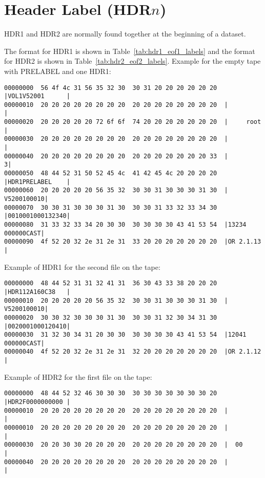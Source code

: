 \section{Header Label (HDR$n$)}

HDR1 and HDR2 are normally found together at the beginning of a dataset.

The format for HDR1 is shown in Table~\ref{tab:hdr1_eof1_labels} and the format for HDR2 is shown in
Table~\ref{tab:hdr2_eof2_labels}.
Example for the empty tape with PRELABEL and one HDR1:
\begin{small}
\begin{verbatim}
00000000  56 4f 4c 31 56 35 32 30  30 31 20 20 20 20 20 20  |VOL1V52001      |
00000010  20 20 20 20 20 20 20 20  20 20 20 20 20 20 20 20  |                |
00000020  20 20 20 20 20 72 6f 6f  74 20 20 20 20 20 20 20  |     root       |
00000030  20 20 20 20 20 20 20 20  20 20 20 20 20 20 20 20  |                |
00000040  20 20 20 20 20 20 20 20  20 20 20 20 20 20 20 33  |               3|
00000050  48 44 52 31 50 52 45 4c  41 42 45 4c 20 20 20 20  |HDR1PRELABEL    |
00000060  20 20 20 20 20 56 35 32  30 30 31 30 30 30 31 30  |     V5200100010|
00000070  30 30 31 30 30 30 31 30  30 30 31 33 32 33 34 30  |0010001000132340|
00000080  31 33 32 33 34 20 30 30  30 30 30 30 43 41 53 54  |13234 000000CAST|
00000090  4f 52 20 32 2e 31 2e 31  33 20 20 20 20 20 20 20  |OR 2.1.13       |
\end{verbatim}
\end{small}
Example of HDR1 for the second file on the tape:
\begin{small}
\begin{verbatim}
00000000  48 44 52 31 31 32 41 31  36 30 43 33 38 20 20 20  |HDR112A160C38   |
00000010  20 20 20 20 20 56 35 32  30 30 31 30 30 30 31 30  |     V5200100010|
00000020  30 30 32 30 30 30 31 30  30 30 31 32 30 34 31 30  |0020001000120410|
00000030  31 32 30 34 31 20 30 30  30 30 30 30 43 41 53 54  |12041 000000CAST|
00000040  4f 52 20 32 2e 31 2e 31  32 20 20 20 20 20 20 20  |OR 2.1.12       |
\end{verbatim}
\end{small}
Example of HDR2 for the first file on the tape:
\begin{small}
\begin{verbatim}
00000000  48 44 52 32 46 30 30 30  30 30 30 30 30 30 30 20  |HDR2F0000000000 |
00000010  20 20 20 20 20 20 20 20  20 20 20 20 20 20 20 20  |                |
00000010  20 20 20 20 20 20 20 20  20 20 20 20 20 20 20 20  |                |
00000030  20 20 30 30 20 20 20 20  20 20 20 20 20 20 20 20  |  00            |
00000040  20 20 20 20 20 20 20 20  20 20 20 20 20 20 20 20  |                |
\end{verbatim}
\end{small}


